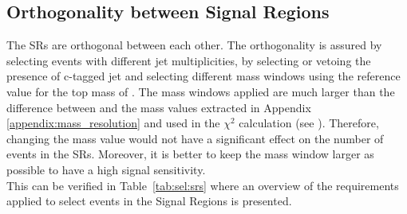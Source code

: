 \subsection{Orthogonality between Signal Regions}
The SRs are orthogonal between each other. The orthogonality is assured by
selecting events with different jet multiplicities, by selecting or vetoing the presence of c-tagged jet and selecting different mass windows using the reference value for the top mass of \mtopvalue. The mass windows applied are much larger than the difference between \mtopvalue and the mass values extracted in Appendix \ref{appendix:mass_resolution} and used in the $\chi^{2}$ calculation (see ). Therefore, changing the mass value would not have a significant effect on the number of events in the SRs. Moreover, it is better to keep the mass window larger as possible to have a high signal sensitivity.\\
This can be verified in Table~\ref{tab:sel:srs} where an overview of the requirements applied to select 
events in the Signal Regions is presented.

